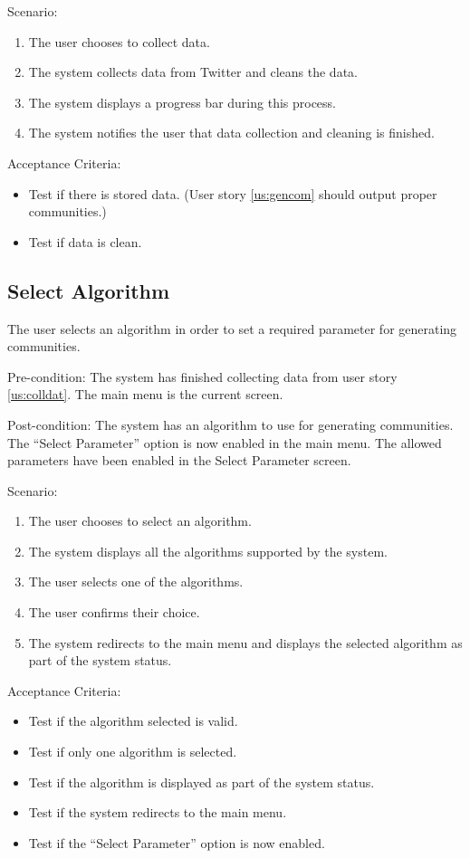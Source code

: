 Scenario:
\begin{enumerate}
	\item The user chooses to collect data.
	\item The system collects data from Twitter and cleans the data.
	\item The system displays a progress bar during this process.
	\item The system notifies the user that data collection and cleaning is finished.
\end{enumerate}

Acceptance Criteria:
\begin{itemize}
	\item Test if there is stored data. (User story \ref{us:gencom} should output proper communities.)
	\item Test if data is clean.
\end{itemize}

\subsection{Select Algorithm}
\label{us:selectalgo}

The user selects an algorithm in order to set a required parameter for generating communities.

Pre-condition: The system has finished collecting data from user story \ref{us:colldat}. 
The main menu is the current screen.

Post-condition: The system has an algorithm to use for generating communities. The ``Select Parameter'' option
is now enabled in the main menu. The allowed parameters have been enabled in the Select Parameter screen.

Scenario:
\begin{enumerate}
	\item The user chooses to select an algorithm.
	\item The system displays all the algorithms supported by the system.
	\item The user selects one of the algorithms.
	\item The user confirms their choice.
	\item The system redirects to the main menu and displays the selected algorithm as part of the system status.
\end{enumerate}

Acceptance Criteria:
\begin{itemize}
	\item Test if the algorithm selected is valid.
	\item Test if only one algorithm is selected.
	\item Test if the algorithm is displayed as part of the system status.
	\item Test if the system redirects to the main menu.
	\item Test if the ``Select Parameter'' option is now enabled.
\end{itemize}

